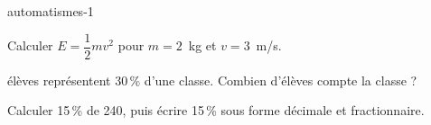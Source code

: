 \begin{blocEdition}{automatismes-1}
\begin{deuxcolonnes}
\begin{questions}
\item \begin{minipage}[t]{\linewidth}\raggedright\leavevmode Calculer $E=\dfrac12mv^2$ pour $m=2$~kg et $v=3$~m/s.\end{minipage}
\item \begin{minipage}[t]{\linewidth}\raggedright{} élèves représentent 30\,\% d’une classe. Combien d’élèves compte la classe ?\end{minipage}
\item \begin{minipage}[t]{\linewidth}\raggedright\leavevmode Calculer 15\,\% de 240, puis écrire 15\,\% sous forme décimale et fractionnaire.\end{minipage}
\end{questions}\end{deuxcolonnes}

\end{blocEdition}
